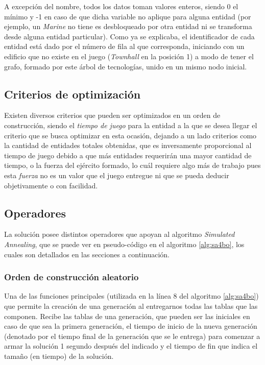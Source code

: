 A excepción del nombre, todos los datos toman valores enteros, siendo 0 el mínimo y -1 en caso de que dicha variable no aplique para alguna entidad (por ejemplo, un \textit{Marine} no tiene es desbloqueado por otra entidad ni se transforma desde alguna entidad particular). Como ya se explicaba, el identificador de cada entidad está dado por el número de fila al que corresponda, iniciando con un edificio que no existe en el juego (\textit{Townhall} en la posición 1) a modo de tener el grafo, formado por este árbol de tecnologías, unido en un mismo nodo inicial.

\subsection{Criterios de optimización}

Existen diversos criterios que pueden ser optimizados en un orden de construcción, siendo el \textit{tiempo de juego} para la entidad a la que se desea llegar el criterio que se busca optimizar en esta ocasión, dejando a un lado criterios como la cantidad de entidades totales obtenidas, que es inversamente proporcional al tiempo de juego debido a que más entidades requerirán una mayor cantidad de tiempo, o la fuerza del ejército formado, lo cuál requiere algo más de trabajo pues esta \textit{fuerza} no es un valor que el juego entregue ni que se pueda deducir objetivamente o con facilidad.

\subsection{Operadores}

La solución posee distintos operadores que apoyan al algoritmo \textit{Simulated Annealing}, que se puede ver en pseudo-código en el algoritmo \ref{alg:sa4bo}, los cuales son detallados en las secciones a continuación.

\subsubsection{Orden de construcción aleatorio}

Una de las funciones principales (utilizada en la línea 8 del algoritmo \ref{alg:sa4bo}) que permite la creación de una generación al entregarnos todas las tablas que las componen. Recibe las tablas de una generación, que pueden ser las iniciales en caso de que sea la primera generación, el tiempo de inicio de la nueva generación (denotado por el tiempo final de la generación que se le entrega) para comenzar a armar la solución 1 segundo después del indicado y el tiempo de fin que indica el tamaño (en tiempo) de la solución.

